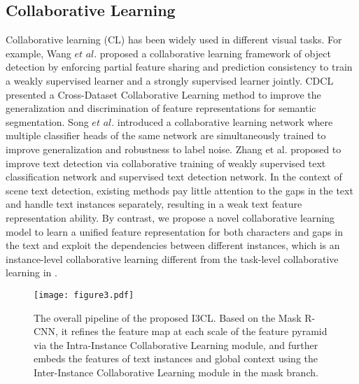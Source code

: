 \subsection{Collaborative Learning}
Collaborative learning (CL) has been widely used in different visual tasks. For example, Wang $et$ $al$. \citep{wang2018collaborative} proposed a collaborative learning framework of object detection by enforcing partial feature sharing and prediction consistency to train a weakly supervised learner and a strongly supervised learner jointly. CDCL \citep{cdcl} presented a Cross-Dataset Collaborative Learning method to improve the generalization and discrimination of feature representations for semantic segmentation. Song $et$ $al$. \citep{song} introduced a collaborative learning network where multiple classifier heads of the same network are simultaneously trained to improve generalization and robustness to label noise.  Zhang et al.\citep{cln} proposed to improve text detection via collaborative training of weakly supervised text classification network and supervised text detection network. In the context of scene text detection, existing methods pay little attention to the gaps in the text and handle text instances separately, resulting in a weak text feature representation ability. By contrast, we propose a novel collaborative learning model to learn a unified feature representation for both characters and gaps in the text and exploit the dependencies between different instances, which is an instance-level collaborative learning different from the task-level collaborative learning in \citep{cln}.

\begin{figure*}[ht]
  \centering
  \texttt{[image: figure3.pdf]}
  \caption{The overall pipeline of the proposed I3CL. Based on the Mask R-CNN, it refines the feature map at each scale of the feature pyramid via the Intra-Instance Collaborative Learning module, and further embeds the features of text instances and global context using the Inter-Instance Collaborative Learning module in the mask branch.}
  \label{fig3}
\end{figure*}

